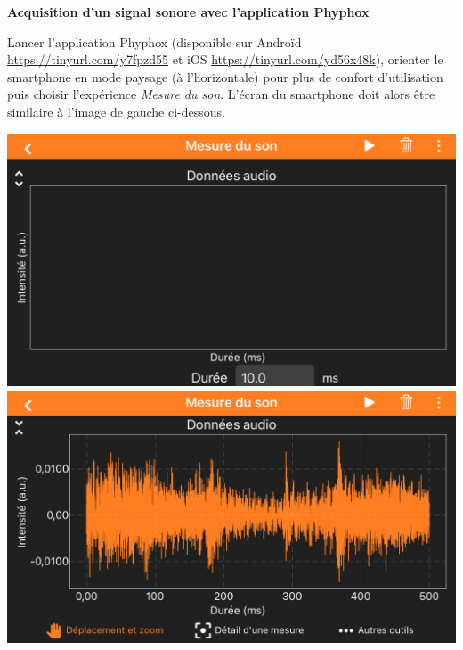 \documentclass[12pt,a4paper]{article}
\begin{document}
\begin{doc}
\label{doc:phyphox}
\textbf{Acquisition d'un signal sonore avec l'application Phyphox}

Lancer l'application Phyphox (disponible sur Androïd \href{https://play.google.com/store/apps/details?id=de.rwth_aachen.phyphox&hl=fr&gl=US}{https://tinyurl.com/y7fpzd55} et iOS \href{https://apps.apple.com/fr/app/phyphox/id1127319693#?platform=iphone}{https://tinyurl.com/yd56x48k}), orienter le smartphone en mode paysage (à l'horizontale) pour plus de confort d'utilisation puis choisir l'expérience \emph{Mesure du son}.
L'écran du smartphone doit alors être similaire à l'image de gauche ci-dessous.

\begin{center}
\includegraphics[scale=0.2]{images/phyphox1.jpeg}
\includegraphics[scale=0.2]{images/phyphox2.jpeg}
\end{center}


\end{doc}
\end{document}
